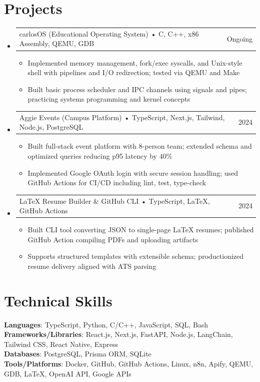 \documentclass[letterpaper,11pt]{article}
\makeatletter
\newcommand{\resumeItem}[1]{
  \item\small{{#1 \vspace{-2pt}}}
}
\newcommand{\resumeProjectHeading}[2]{
    \item
    \begin{tabular*}{0.97\textwidth}{l@{\extracolsep{\fill}}r}
      \small#1 & #2 \\
    \end{tabular*}\vspace{-7pt}
}
\newcommand{\resumeSubHeadingListStart}{\begin{itemize}[leftmargin=0.15in, label={}]}
\newcommand{\resumeSubHeadingListEnd}{\end{itemize}}
\newcommand{\resumeItemListStart}{\begin{itemize}}
\newcommand{\resumeItemListEnd}{\end{itemize}\vspace{-5pt}}
\makeatother
\begin{document}
\section{Projects}
\resumeSubHeadingListStart
  \resumeProjectHeading
    {carlosOS \textnormal{(Educational Operating System)} • C, C++, x86 Assembly, QEMU, GDB}{Ongoing}
    \resumeItemListStart
      \resumeItem{Implemented memory management, fork/exec syscalls, and Unix-style shell with pipelines and I/O redirection; tested via QEMU and Make}
      \resumeItem{Built basic process scheduler and IPC channels using signals and pipes; practicing systems programming and kernel concepts}
    \resumeItemListEnd

  \resumeProjectHeading
    {Aggie Events \textnormal{(Campus Platform)} • TypeScript, Next.js, Tailwind, Node.js, PostgreSQL}{2024}
    \resumeItemListStart
      \resumeItem{Built full-stack event platform with 8-person team; extended schema and optimized queries reducing p95 latency by 40\%}
      \resumeItem{Implemented Google OAuth login with secure session handling; used GitHub Actions for CI/CD including lint, test, type-check}
    \resumeItemListEnd

  \resumeProjectHeading
    {LaTeX Resume Builder \& GitHub CLI • TypeScript, LaTeX, GitHub Actions}{2024}
    \resumeItemListStart
      \resumeItem{Built CLI tool converting JSON to single-page LaTeX resumes; published GitHub Action compiling PDFs and uploading artifacts}
      \resumeItem{Supports structured templates with extensible schema; productionized resume delivery aligned with ATS parsing}
    \resumeItemListEnd
\resumeSubHeadingListEnd

\section{Technical Skills}
\begin{itemize}[leftmargin=0.15in, label={}]
  \small{\item{
    \textbf{Languages}{: TypeScript, Python, C/C++, JavaScript, SQL, Bash} \\
    \textbf{Frameworks/Libraries}{: React.js, Next.js, FastAPI, Node.js, LangChain, Tailwind CSS, React Native, Express} \\
    \textbf{Databases}{: PostgreSQL, Prisma ORM, SQLite} \\
    \textbf{Tools/Platforms}{: Docker, GitHub, GitHub Actions, Linux, n8n, Apify, QEMU, GDB, LaTeX, OpenAI API, Google APIs}
  }}
\end{itemize}
\end{document}
